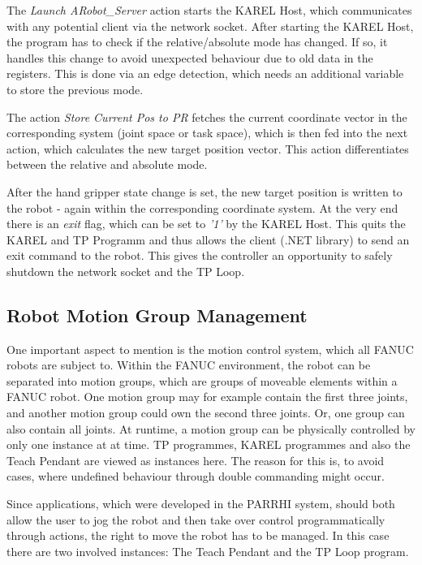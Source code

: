 The \textit{Launch ARobot\_Server} action starts the KAREL Host, which communicates with any potential client via the network socket. After starting the KAREL Host, the program has to check if the relative/absolute mode has changed. If so, it handles this change to avoid unexpected behaviour due to old data in the registers. This is done via an edge detection, which needs an additional variable to store the previous mode. 

The action \textit{Store Current Pos to PR} fetches the current coordinate vector in the corresponding system (joint space or task space), which is then fed into the next action, which calculates the new target position vector. This action differentiates between the relative and absolute mode. 

After the hand gripper state change is set, the new target position is written to the robot - again within the corresponding coordinate system. At the very end there is an \textit{exit} flag, which can be set to \textit{'1'} by the KAREL Host. This quits the KAREL and TP Programm and thus allows the client (.NET library) to send an exit command to the robot. This gives the controller an opportunity to safely shutdown the network socket and the TP Loop. 

\subsection{Robot Motion Group Management}

One important aspect to mention is the motion control system, which all FANUC robots are subject to. Within the FANUC environment, the robot can be separated into motion groups, which are groups of moveable elements within a FANUC robot. One motion group may for example contain the first three joints, and another motion group could own the second three joints. Or, one group can also contain all joints. At runtime, a motion group can be physically controlled by only one instance at at time. TP programmes, KAREL programmes and also the Teach Pendant are viewed as instances here. The reason for this is, to avoid cases, where undefined behaviour through double commanding might occur. 

Since applications, which were developed in the PARRHI system, should both allow the user to jog the robot and then take over control programmatically through actions, the right to move the robot has to be managed. In this case there are two involved instances: The Teach Pendant and the TP Loop program.

